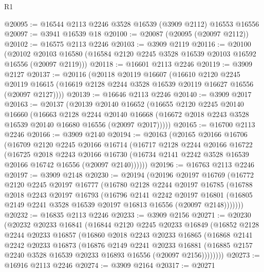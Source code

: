 \begin{lexlean}{R1}
\begin{coremodule}
@20095 := @16544 @2113 @2246 @3528 @16539 (@3909 @2112) @16553 @16556
@20097 := @3941 @16539 @18
@20100 := @20087 (@20095 (@20097 @2112))
@20102 := @16575 @2113 @2246
@20103 := @3909 @2119
@20116 := @20100
    (@20102 @20103 @16580 (@16584 @2120 @2245 @3528 @16539 @20103 @16592 @16556 (@20097 @2119)))
@20118 := @16601 @2113 @2246
@20119 := @3909 @2127
@20137 := @20116
    (@20118
      @20119
      @16607
      (@16610
        @2120
        @2245
        @20119
        @16615
        (@16619 @2128 @2244 @3528 @16539 @20119 @16627 @16556 (@20097 @2127))))
@20139 := @16646 @2113 @2246
@20140 := @3909 @2017
@20163 := @20137
    (@20139
      @20140
      @16652
      (@16655
        @2120
        @2245
        @20140
        @16660
        (@16663
          @2128
          @2244
          @20140
          @16668
          (@16672 @2018 @2243 @3528 @16539 @20140 @16680 @16556 (@20097 @2017)))))
@20165 := @16700 @2113 @2246
@20166 := @3909 @2140
@20194 := @20163
    (@20165
      @20166
      @16706
      (@16709
        @2120
        @2245
        @20166
        @16714
        (@16717
          @2128
          @2244
          @20166
          @16722
          (@16725
            @2018
            @2243
            @20166
            @16730
            (@16734 @2141 @2242 @3528 @16539 @20166 @16742 @16556 (@20097 @2140))))))
@20196 := @16763 @2113 @2246
@20197 := @3909 @2148
@20230 := @20194
    (@20196
      @20197
      @16769
      (@16772
        @2120
        @2245
        @20197
        @16777
        (@16780
          @2128
          @2244
          @20197
          @16785
          (@16788
            @2018
            @2243
            @20197
            @16793
            (@16796
              @2141
              @2242
              @20197
              @16801
              (@16805 @2149 @2241 @3528 @16539 @20197 @16813 @16556 (@20097 @2148)))))))
@20232 := @16835 @2113 @2246
@20233 := @3909 @2156
@20271 := @20230
    (@20232
      @20233
      @16841
      (@16844
        @2120
        @2245
        @20233
        @16849
        (@16852
          @2128
          @2244
          @20233
          @16857
          (@16860
            @2018
            @2243
            @20233
            @16865
            (@16868
              @2141
              @2242
              @20233
              @16873
              (@16876
                @2149
                @2241
                @20233
                @16881
                (@16885 @2157 @2240 @3528 @16539 @20233 @16893 @16556 (@20097 @2156))))))))
@20273 := @16916 @2113 @2246
@20274 := @3909 @2164
@20317 := @20271

\end{coremodule}
\end{lexlean}
